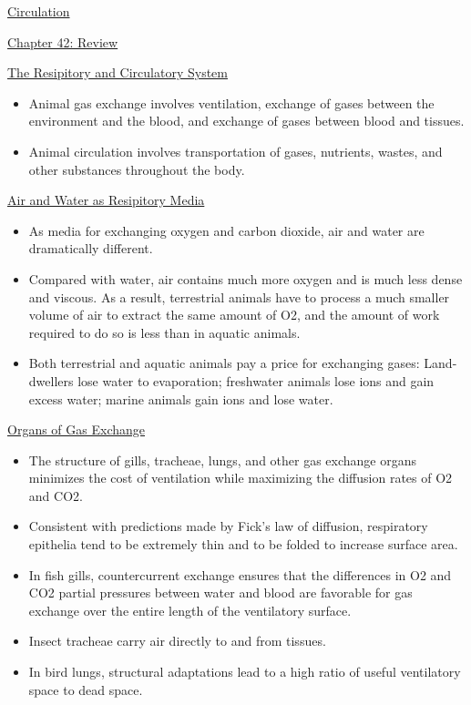 \documentclass[12pt,letterpaper]{article}
\begin{document}
\begin{secbox}{\hyperlink{42}{Circulation}}
{\hypertarget{42.r}{}
\begin{probbox}{\hyperlink{42}{Chapter 42: Review}}\end{probbox}
    \hyperlink{42.1}{The Resipitory and Circulatory System}
    \begin{itemize}
        \item Animal gas exchange involves ventilation, exchange of gases between the environment and the blood, and exchange of gases between blood and tissues. 
        \item Animal circulation involves transportation of gases, nutrients, wastes, and other substances throughout the body.
    \end{itemize}
    \hyperlink{42.2}{Air and Water as Resipitory Media}
    \begin{itemize}
        \item As media for exchanging oxygen and carbon dioxide, air and water are dramatically different. 
        \item Compared with water, air contains much more oxygen and is much less dense and viscous. As a result, terrestrial animals have to process a much smaller volume of air to extract the same amount of O2, and the amount of work required to do so is less than in aquatic animals. 
        \item Both terrestrial and aquatic animals pay a price for exchanging gases: Land-dwellers lose water to evaporation; freshwater animals lose ions and gain excess water; marine animals gain ions and lose water.      
    \end{itemize}
    \hyperlink{42.3}{Organs of Gas Exchange}
    \begin{itemize}
        \item The structure of gills, tracheae, lungs, and other gas exchange organs minimizes the cost of ventilation while maximizing the diffusion rates of O2 and CO2. 
        \item Consistent with predictions made by Fick’s law of diffusion, respiratory epithelia tend to be extremely thin and to be folded to increase surface area. 
        \item In fish gills, countercurrent exchange ensures that the differences in O2 and CO2 partial pressures between water and blood are favorable for gas exchange over the entire length of the ventilatory surface. 
        \item Insect tracheae carry air directly to and from tissues. 
        \item In bird lungs, structural adaptations lead to a high ratio of useful ventilatory space to dead space. 

\end{itemize}}
\end{secbox}
\end{document}
